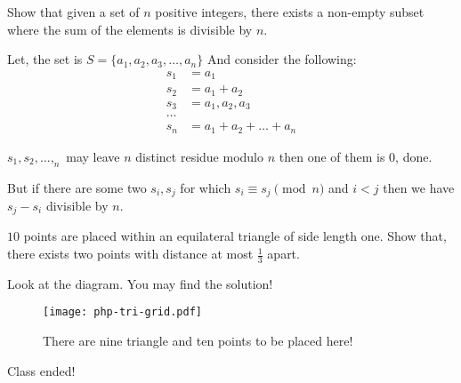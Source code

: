 \begin{example}
Show that given a set of $n$ positive integers, there exists a non-empty subset where the sum of the elements is divisible by $n$.
\end{example}
Let, the set is $S=\{a_1, a_2, a_3, \dots , a_n \}$
And consider the following: 
\begin{align*}
s_1 &= a_1  \\
s_2 &= a_1+ a_2 \\
s_3 &= a_1, a_2, a_3 \\
\ldots \\
s_n &= a_1+ a_2+ \ldots + a_n
\end{align*}

$s_1, s_2, \ldots, _n$ may leave $n$ distinct residue modulo $n$ then one of them is $0$, done.

But if there are some two $s_i, s_j$ for which $s_i\equiv s_j \pmod n$ and $i<j$ then we have $s_j-s_i$ divisible by $n$.
\begin{example}
$10$ points are placed within an equilateral triangle of side length one. Show that, there exists two points with distance at most $\frac{1}{3}$ apart.
\end{example}
Look at the diagram. You may find the solution!
\begin{figure}[h!]
\centering
	\texttt{[image: php-tri-grid.pdf]}
	\caption{There are nine triangle and ten points to be placed here!}
\end{figure}

Class ended!